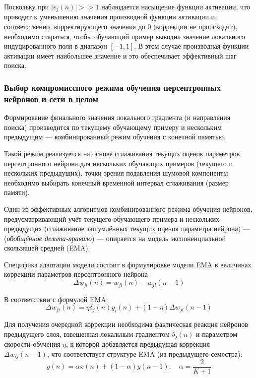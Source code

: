 \documentclass[a4paper]{article}
\numberwithin{equation}{subsection}
\begin{document}
Поскольку при $\lvert v_j(n) \rvert >> 1$ наблюдается насыщение функции активации,
что приводит к уменьшению значения производной функции активации и, соответственно,
корректирующего значения до 0 (коррекции не происходит), необходимо стараться, чтобы
обучающий пример выводил значение локального индуцированного поля 
в диапазон $\left[-1,1\right]$.
В этом случае производная функции активации имеет наибольшее значение и это обеспечивает
эффективный шаг поиска.




\subsubsection{Выбор компромиссного режима обучения персептронных нейронов и сети в целом}

Формирование финального значения локального градиента (и направления поиска) производится
по текущему обучающему примеру и нескольким предыдущим --- комбинированный режим обучения
с конечной памятью.

Такой режим реализуется на основе сглаживания текущих оценок параметров персептронного 
нейрона для нескольких обучающих примеров (текущего и нескольких предыдущих).
точки зрения подавления шумовой компоненты необходимо выбирать конечный временной 
интервал сглаживания (размер памяти). 

Один из эффективных алгоритмов комбинированного режима обучения нейронов, предусматривающий
учёт текущего обучающего примера и нескольких предыдущих (сглаживание зашумлённых 
текущих оценок параметра нейрона) --- (\textit{обобщённое дельта-правило}) --- опирается 
на модель экспоненциальной скользящей средней (EMA).

Специфика адаптации модели состоит в формулировке модели EMA в величинах коррекции 
параметров персептронного нейрона
\begin{equation}
    \Delta w_{ji}(n) = w_{ji}(n) - w_{ji}(n-1)
\end{equation}

В соответствии с формулой EMA:
\begin{equation}
    \Delta w_{ji}(n) = \eta \delta_j(n) y_i(n) + (1-\eta) \Delta w_{ji}(n-1)
\end{equation}

Для получения очередной коррекции необходима фактическая реакция нейронов предыдущего
слоя, взвешенная локальным градиентом $\delta_j(n)$ и параметром скорости обучения $\eta$,
к которой добавляется предыдущая коррекция $\Delta w_{ij}(n-1)$, что соответствует
структуре EMA (из предыдущего семестра):
\begin{equation}
    y(n)=\alpha x(n) + (1 - \alpha) y(n-1), \quad \alpha = \dfrac{2}{K+1}
\end{equation}
\end{document}
